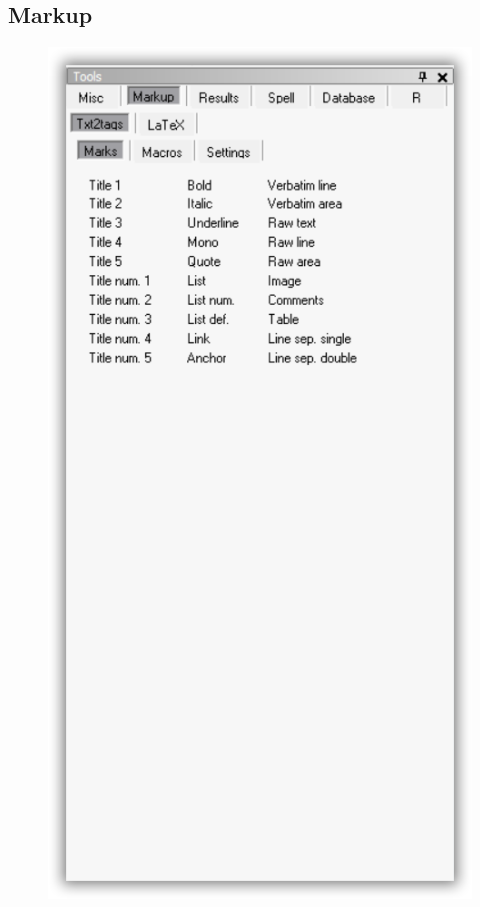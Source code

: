 \hypertarget{working_tools_markup}{}
\subsection{Markup}

\begin{figure}[H]
  \includegraphics[scale=0.35]{./res/tools_markup_txt2tags_marks.png}~~

\end{figure}
